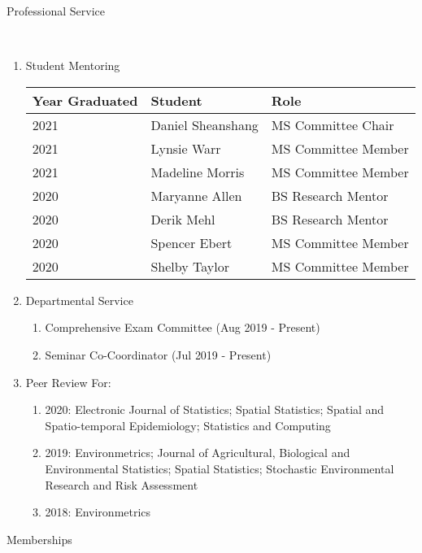 \documentclass[12pt]{article}
\newcommand{\head}[1]{ %
    \bigskip %
    \begin{large}\begin{bf}{#1}\end{bf}\end{large} %

    \ \\ [-1.3cm] %

    \hrulefill}
\begin{document}
\head{Professional Service}
\begin{enumerate}[label=$\bullet$]

\item Student Mentoring

\begin{table}[H]
\centering
\begin{tabular}{lll}
  \hline
Year Graduated & Student & Role \\ 
  \hline
2021  & Daniel Sheanshang & MS Committee Chair  \\ 
2021  & Lynsie Warr & MS Committee Member  \\ 
2021  & Madeline Morris & MS Committee Member  \\ 
2020  & Maryanne Allen & BS Research Mentor  \\ 
2020  & Derik Mehl & BS Research Mentor \\ 
2020  & Spencer Ebert & MS Committee Member  \\ 
2020  & Shelby Taylor & MS Committee Member  \\ 
   \hline
\end{tabular}
\end{table}

\item Departmental Service
\begin{enumerate}[label=$\cdot$]
\item Comprehensive Exam Committee (Aug 2019 - Present)
\item Seminar Co-Coordinator (Jul 2019 - Present)
\end{enumerate}

\item Peer Review For:
\begin{enumerate}[label=$\cdot$]
\item 2020: Electronic Journal of Statistics; Spatial Statistics; Spatial and Spatio-temporal Epidemiology; Statistics and Computing
\item 2019: Environmetrics; Journal of Agricultural, Biological and Environmental Statistics; Spatial Statistics; Stochastic Environmental Research and Risk Assessment 
\item 2018: Environmetrics 
\end{enumerate}
\end{enumerate}


\head{Memberships}
\end{document}
